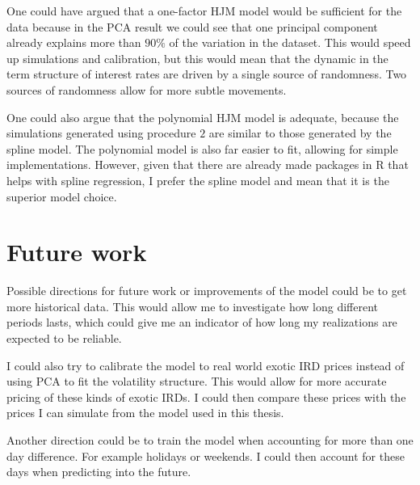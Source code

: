 One could have argued that a one-factor HJM model would be sufficient for the data because in the PCA result we could see that one principal component already explains more than $90\%$ of the variation in the dataset. This would speed up simulations and calibration, but this would mean that the dynamic in the term structure of interest rates are driven by a single source of randomness. Two sources of randomness allow for more subtle movements.

One could also argue that the polynomial HJM model is adequate, because the \newpage \noindent simulations generated using procedure $2$ are similar to those generated by the spline model. The polynomial model is also far easier to fit, allowing for simple implementations. However, given that there are already made packages in R that helps with spline regression, I prefer the spline model and mean that it is the superior model choice.


\section{Future work}

\noindent Possible directions for future work or improvements of the model could be to get more historical data. This would allow me to investigate how long different periods lasts, which could give me an indicator of how long my realizations are expected to be reliable.

I could also try to calibrate the model to real world exotic IRD prices instead of using PCA to fit the volatility structure. This would allow for more accurate pricing of these kinds of exotic IRDs. I could then compare these prices with the prices I can simulate from the model used in this thesis.

Another direction could be to train the model when accounting for more than one day difference. For example holidays or weekends. I could then account for these days when predicting into the future.

